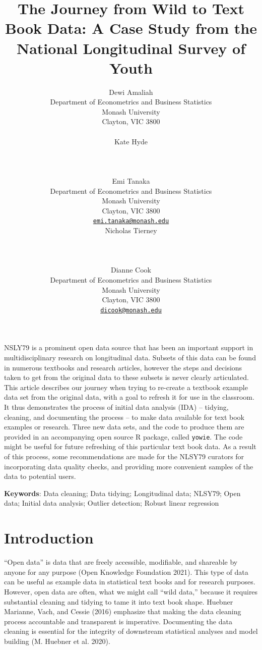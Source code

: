 \documentclass{article}
\title{The Journey from Wild to Text Book Data: A Case Study from the National Longitudinal Survey of Youth}
\author{
    Dewi Amaliah
   \\
    Department of Econometrics and Business Statistics \\
    Monash University \\
  Clayton, VIC 3800 \\
  \texttt{} \\
   \And
    Kate Hyde
   \\
     \\
   \\
  \texttt{} \\
   \And
    Emi Tanaka
   \\
    Department of Econometrics and Business Statistics \\
    Monash University \\
  Clayton, VIC 3800 \\
  \texttt{\href{mailto:emi.tanaka@monash.edu}{\nolinkurl{emi.tanaka@monash.edu}}} \\
   \And
    Nicholas Tierney
   \\
     \\
   \\
  \texttt{} \\
   \And
    Dianne Cook
   \\
    Department of Econometrics and Business Statistics \\
    Monash University \\
  Clayton, VIC 3800 \\
  \texttt{\href{mailto:dicook@monash.edu}{\nolinkurl{dicook@monash.edu}}} \\
  }
\begin{document}
\maketitle

\def\tightlist{}


\begin{abstract}

\end{abstract}


NSLY79 is a prominent open data source that has been an important support in multidisciplinary research on longitudinal data. Subsets of this data can be found in numerous textbooks and research articles, however the steps and decisions taken to get from the original data to these subsets is never clearly articulated. This article describes our journey when trying to re-create a textbook example data set from the original data, with a goal to refresh it for use in the classroom. It thus demonstrates the process of initial data analysis (IDA) -- tidying, cleaning, and documenting the process -- to make data available for text book examples or research. Three new data sets, and the code to produce them are provided in an accompanying open source R package, called \texttt{yowie}. The code might be useful for future refreshing of this particular text book data. As a result of this process, some recommendations are made for the NLSY79 curators for incorporating data quality checks, and providing more convenient samples of the data to potential users.

\textbf{Keywords}: Data cleaning; Data tidying; Longitudinal data; NLSY79; Open data; Initial data analysis; Outlier detection; Robust linear regression

\hypertarget{introduction}{%
\section{Introduction}\label{introduction}}

``Open data'' is data that are freely accessible, modifiable, and shareable by anyone for any purpose (Open Knowledge Foundation 2021). This type of data can be useful as example data in statistical text books and for research purposes. However, open data are often, what we might call ``wild data,'' because it requires substantial cleaning and tidying to tame it into text book shape. Huebner Marianne, Vach, and Cessie (2016) emphasize that making the data cleaning process accountable and transparent is imperative. Documenting the data cleaning is essential for the integrity of downstream statistical analyses and model building (M. Huebner et al. 2020).
\end{document}

